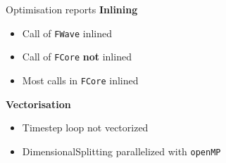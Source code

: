 \documentclass[shortpres,usenames,dvipsnames]{beamer}
\begin{document}
\begin{frame}[fragile]{Optimisation reports}
	\textbf{Inlining}
	\begin{itemize}
		\item Call of \verb|FWave| inlined
		\item Call of \verb|FCore| \textbf{not} inlined
		\item Most calls in \verb|FCore| inlined
	\end{itemize}
	\vspace{10pt}
	\textbf{Vectorisation}
	\begin{itemize}
 		\item Timestep loop not vectorized
 		\item DimensionalSplitting parallelized with \verb|openMP|
	\end{itemize}
\end{frame}
\end{document}
